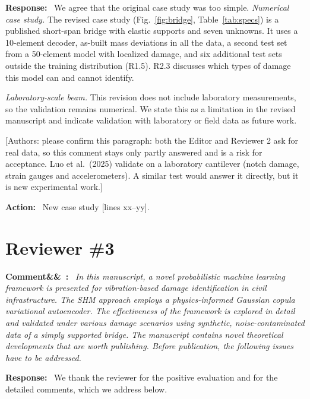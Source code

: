 \documentclass[11pt]{article}
\newenvironment{rcomment}[1]{\par\bigskip\noindent\textbf{Comment\ifx&#1&\else\ #1\fi:}\ \itshape}{\par}
\newenvironment{response}{\par\smallskip\noindent\color{resp}\textbf{Response:}\ }{\par}
\newenvironment{action}{\par\smallskip\noindent\color{resp}\textbf{Action:}\ }{\par}
\newcommand{\authornote}[1]{\textcolor{note}{\textsf{[Authors: #1]}}}
\newcommand{\tbd}[1]{\textcolor{note}{\textsf{[#1]}}}
\newcommand{\lines}[1]{\tbd{lines #1}}
\begin{document}
\begin{response}
We agree that the original case study was too simple. \textit{Numerical case study.} The revised case study (Fig.~\ref{fig:bridge}, Table~\ref{tab:specs}) is a published short-span bridge with
elastic supports and seven unknowns. It uses a 10-element decoder, as-built mass deviations in all the data, a second test set from
a 50-element model with localized damage, and six additional test sets outside the training distribution (R1.5). R2.3 discusses which types of damage this model
can and cannot identify.

\textit{Laboratory-scale beam.} This revision does not include laboratory measurements, so the validation remains numerical.
We state this as a limitation in the revised manuscript and indicate validation with laboratory or field data as future
work.
\end{response}
\authornote{please confirm this paragraph: both the Editor and Reviewer 2 ask for real data, so this comment stays only partly
answered and is a risk for acceptance. Luo et al.\ (2025) validate on a laboratory cantilever (notch damage, strain gauges and
accelerometers). A similar test would answer it directly, but it is new experimental work.}

\begin{action}
New case study \lines{xx--yy}.
\end{action}

\section{Reviewer \#3}

\begin{rcomment}{}
In this manuscript, a novel probabilistic machine learning framework is presented for vibration-based damage
identification in civil infrastructure. The SHM approach employs a physics-informed Gaussian copula variational
autoencoder. The effectiveness of the framework is explored in detail and validated under various damage scenarios
using synthetic, noise-contaminated data of a simply supported bridge. The manuscript contains novel theoretical
developments that are worth publishing. Before publication, the following issues have to be addressed.
\end{rcomment}

\begin{response}
We thank the reviewer for the positive evaluation and for the detailed comments, which we address below.
\end{response}
\end{document}

